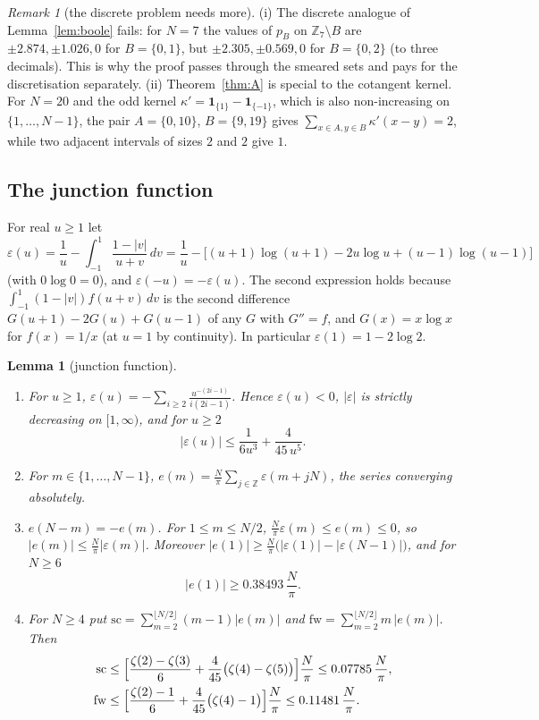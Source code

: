 \documentclass[11pt]{amsart}
\newtheorem{lemma}[theorem]{Lemma}
\theoremstyle{definition}
\theoremstyle{remark}
\newtheorem{remark}[theorem]{Remark}
\newcommand{\Z}{\mathbb{Z}}
\newcommand{\sprod}{\mathrm{sc}}
\newcommand{\fw}{\mathrm{fw}}
\newcommand{\one}{\mathbf{1}}
\begin{document}
\begin{remark}[the discrete problem needs more]\label{rem:discrete}
(i) The discrete analogue of Lemma~\ref{lem:boole} fails: for $N=7$ the values of $p_B$ on $\Z_7\setminus B$ are
$\pm2.874,\pm1.026,0$ for $B=\{0,1\}$, but $\pm2.305,\pm0.569,0$ for $B=\{0,2\}$ (to three decimals). This is why
the proof passes through the smeared sets and pays for the discretisation separately. (ii) Theorem~\ref{thm:A} is
special to the cotangent kernel. For $N=20$ and the odd kernel $\kappa'=\one_{\{1\}}-\one_{\{-1\}}$, which is also
non-increasing on $\{1,\dots,N-1\}$, the pair $A=\{0,10\}$, $B=\{9,19\}$ gives
$\sum_{x\in A,y\in B}\kappa'(x-y)=2$, while two adjacent intervals of sizes $2$ and $2$ give $1$.
\end{remark}

\subsection{The junction function}
For real $u\ge1$ let
\[
\varepsilon(u)=\frac1u-\int_{-1}^{1}\frac{1-|v|}{u+v}\,dv
=\frac1u-\bigl[(u+1)\log(u+1)-2u\log u+(u-1)\log(u-1)\bigr]
\]
(with $0\log0=0$), and $\varepsilon(-u)=-\varepsilon(u)$. The second expression holds because
$\int_{-1}^1(1-|v|)f(u+v)\,dv$ is the second difference $G(u+1)-2G(u)+G(u-1)$ of any $G$ with $G''=f$, and
$G(x)=x\log x$ for $f(x)=1/x$ (at $u=1$ by continuity). In particular $\varepsilon(1)=1-2\log2$.

\begin{lemma}[junction function]\label{lem:junction}
\begin{enumerate}
\item For $u\ge1$, $\displaystyle\varepsilon(u)=-\sum_{i\ge2}\frac{u^{-(2i-1)}}{i(2i-1)}$. Hence $\varepsilon(u)<0$,
$|\varepsilon|$ is strictly decreasing on $[1,\infty)$, and for $u\ge2$
\[
|\varepsilon(u)|\le\frac1{6u^3}+\frac{4}{45\,u^5}.
\]
\item For $m\in\{1,\dots,N-1\}$, $e(m)=\frac N\pi\sum_{j\in\Z}\varepsilon(m+jN)$, the series converging
absolutely.
\item $e(N-m)=-e(m)$. For $1\le m\le N/2$, $\frac N\pi\varepsilon(m)\le e(m)\le0$, so $|e(m)|\le\frac N\pi|\varepsilon(m)|$.
Moreover $|e(1)|\ge\frac N\pi\bigl(|\varepsilon(1)|-|\varepsilon(N-1)|\bigr)$, and for $N\ge6$
\[
|e(1)|\ge 0.38493\,\frac N\pi .
\]
\item For $N\ge 4$ put $\sprod=\sum_{m=2}^{\lfloor N/2\rfloor}(m-1)|e(m)|$ and $\fw=\sum_{m=2}^{\lfloor N/2\rfloor}m\,|e(m)|$.
Then
\begin{align*}
\sprod&\le\Bigl[\frac{\zeta(2)-\zeta(3)}6+\frac4{45}\bigl(\zeta(4)-\zeta(5)\bigr)\Bigr]\frac N\pi\le0.07785\,\frac N\pi,\\
\fw&\le\Bigl[\frac{\zeta(2)-1}6+\frac4{45}\bigl(\zeta(4)-1\bigr)\Bigr]\frac N\pi\le0.11481\,\frac N\pi .
\end{align*}
\end{enumerate}
\end{lemma}
\end{document}
